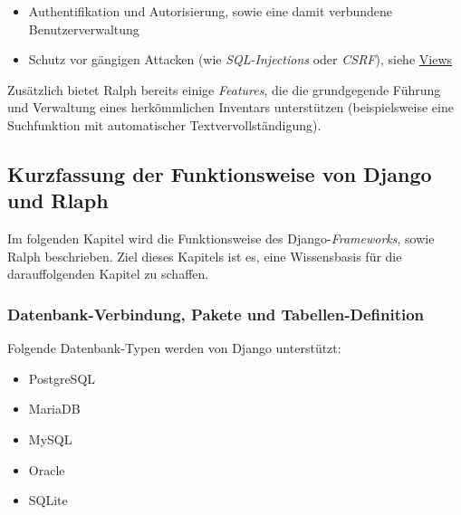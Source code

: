 \begin{itemize}
\tightlist
\item
  Authentifikation und Autorisierung, sowie eine damit verbundene
  Benutzerverwaltung
\item
  Schutz vor gängigen Attacken (wie
  \emph{SQL-Injections}
  oder
  \emph{CSRF}\cite{csrf}),
  siehe \protect\hyperlink{views}{Views}
\end{itemize}

Zusätzlich bietet Ralph bereits einige
\emph{Features},
die die grundgegende Führung und Verwaltung eines herkömmlichen
Inventars unterstützen (beispielsweise eine Suchfunktion mit
automatischer Textvervollständigung).

\hypertarget{kurzfassung-der-funktionsweise-von-django-und-rlaph}{%
\subsection{Kurzfassung der Funktionsweise von Django und
Rlaph}\label{kurzfassung-der-funktionsweise-von-django-und-rlaph}}

Im folgenden Kapitel wird die Funktionsweise des
Django-\emph{Frameworks},
sowie Ralph beschrieben. Ziel dieses Kapitels ist es, eine Wissensbasis
für die darauffolgenden Kapitel zu schaffen.

\hypertarget{datenbank-verbindung-pakete-und-tabellen-definition}{%
\subsubsection{Datenbank-Verbindung, Pakete und
Tabellen-Definition}\label{datenbank-verbindung-pakete-und-tabellen-definition}}

Folgende Datenbank-Typen werden von Django unterstützt:

\begin{itemize}
\tightlist
\item
  PostgreSQL
\item
  MariaDB
\item
  MySQL
\item
  Oracle
\item
  SQLite
\end{itemize}

